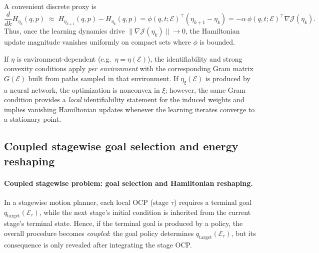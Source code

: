 \begin{remark}
A convenient discrete proxy is
\[
\frac{d}{dk}H_{\eta_k}(q,p)\;\approx\;H_{\eta_{k+1}}(q,p)-H_{\eta_k}(q,p)
=\phi(q,t;\mathcal E)^\top(\eta_{k+1}-\eta_k)
=-\alpha~\phi(q,t;\mathcal E)^\top\nabla\mathcal J(\eta_k).
\]
Thus, once the learning dynamics drive $\|\nabla\mathcal J(\eta_k)\|\to 0$, the Hamiltonian update magnitude
vanishes uniformly on compact sets where $\phi$ is bounded.
\end{remark}

\begin{remark}
If $\eta$ is environment-dependent (e.g.\ $\eta=\eta(\mathcal E)$), the identifiability and strong convexity conditions
apply \emph{per environment} with the corresponding Gram matrix $G(\mathcal E)$ built from paths sampled in that environment.
If $\eta_\xi(\mathcal E)$ is produced by a neural network, the optimization is nonconvex in $\xi$; however, the same Gram
condition provides a \emph{local} identifiability statement for the induced weights and implies vanishing Hamiltonian updates
whenever the learning iterates converge to a stationary point.
\end{remark}
\subsection{Coupled stagewise goal selection and energy {reshaping}}
\label{app:coupled_stagewise}


\paragraph{Coupled stagewise problem: goal selection and Hamiltonian {reshaping}.}
In a stagewise motion planner, each local OCP (stage $\tau$) requires a terminal goal
$q_{\mathrm{target}}(\mathcal{E}_{\tau})$, while the next stage’s initial condition is inherited from the current stage’s terminal state.
Hence, if the terminal goal is produced by a policy, the overall procedure becomes \emph{coupled}:
the goal policy determines $q_{\mathrm{target}}(\mathcal{E}_{\tau})$, but its consequence is only revealed after integrating the stage OCP.

